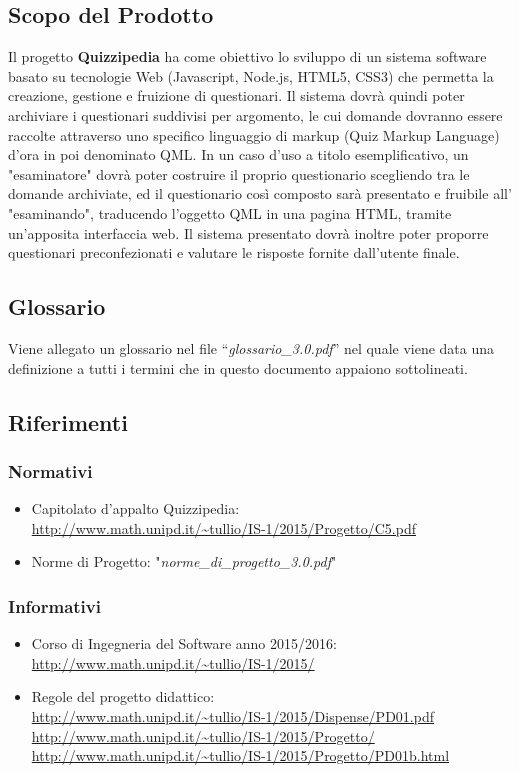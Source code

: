 \documentclass[a4paper,11pt]{article}
\begin{document}
	\subsection{Scopo del Prodotto}
	Il progetto \textbf{Quizzipedia} ha come obiettivo lo sviluppo di un sistema software basato su tecnologie Web (Javascript, Node.js, HTML5, CSS3) che permetta la creazione, gestione e fruizione di questionari. Il sistema dovrà quindi poter archiviare i questionari suddivisi per argomento, le cui domande dovranno essere raccolte attraverso uno specifico linguaggio di markup (Quiz Markup Language) d'ora in poi denominato QML. In un caso d'uso a titolo esemplificativo, un "esaminatore" dovrà poter costruire il proprio questionario scegliendo tra le domande archiviate, ed il questionario così composto sarà presentato e fruibile all' "esaminando", traducendo l'oggetto QML in una pagina HTML, tramite un'apposita interfaccia web. Il sistema presentato dovrà inoltre poter proporre questionari preconfezionati e valutare le risposte fornite dall'utente finale.
	\subsection{Glossario}
	Viene allegato un glossario nel file ``\textit{glossario\_3.0.pdf}'' nel quale viene data una definizione a tutti i termini che in questo documento appaiono sottolineati.
	\subsection{Riferimenti}
		\subsubsection{Normativi}
		\begin{itemize}
			\item Capitolato d'appalto Quizzipedia:\\
			\url{http://www.math.unipd.it/~tullio/IS-1/2015/Progetto/C5.pdf}
			\item Norme di Progetto: "\textit{norme\_di\_progetto\_3.0.pdf}"
		\end{itemize}
		\subsubsection{Informativi}
		\begin{itemize}
			\item Corso di Ingegneria del Software anno 2015/2016:\\
			\url{http://www.math.unipd.it/~tullio/IS-1/2015/}
			\item Regole del progetto didattico:\\
			\url{http://www.math.unipd.it/~tullio/IS-1/2015/Dispense/PD01.pdf}
			\url{http://www.math.unipd.it/~tullio/IS-1/2015/Progetto/}\\
			\url{http://www.math.unipd.it/~tullio/IS-1/2015/Progetto/PD01b.html}
		\end{itemize}
	\pagebreak
\end{document}
